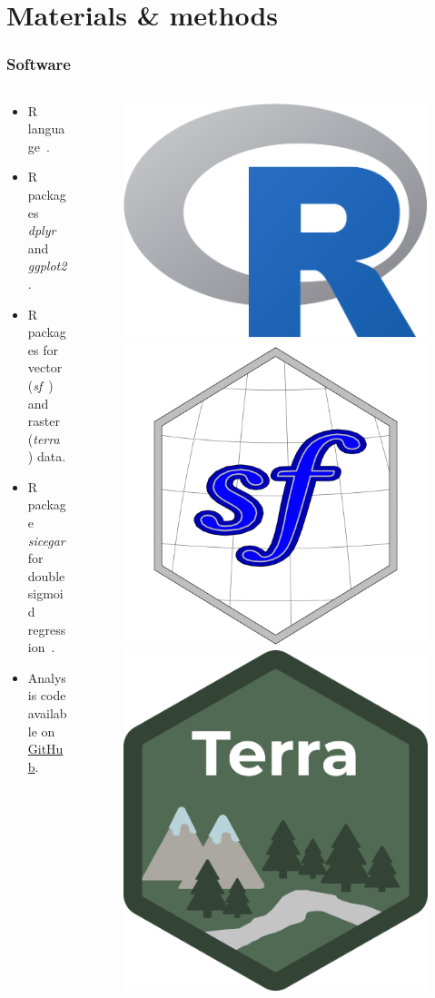 \documentclass[aspectratio=169]{beamer}
\begin{document}
\section{Materials \& methods}

\begin{frame}
    \frametitle{Software}
    \begin{columns}
        \begin{column}{0.5\linewidth}
            \begin{itemize}
                \item R language~\cite{ihaka1996}.
                \item R packages \textit{dplyr} and \textit{ggplot2}.
                \item R packages for vector (\textit{sf}~\cite{pebesma2018})
                    and raster (\textit{terra}~\cite{hijmans2020}) data.
                \item R package \textit{sicegar} for double sigmoid
                    regression~\cite{caglar2018}.
                \item Analysis code available on
                    \href{https://github.com/albhasan/seasonmetrics}{GitHub}.
            \end{itemize}
        \end{column}
        \begin{column}{0.5\linewidth}
            \begin{figure}[h]
                \includegraphics[width=0.35\linewidth]{./logos/Rlogo.png}
                \includegraphics[width=0.29\linewidth]{./logos/sf_logo.png}
                \includegraphics[width=0.25\linewidth]{./logos/terra_logo.png}\\

\end{figure}
\end{column}
\end{columns}
\end{frame}
\end{document}
